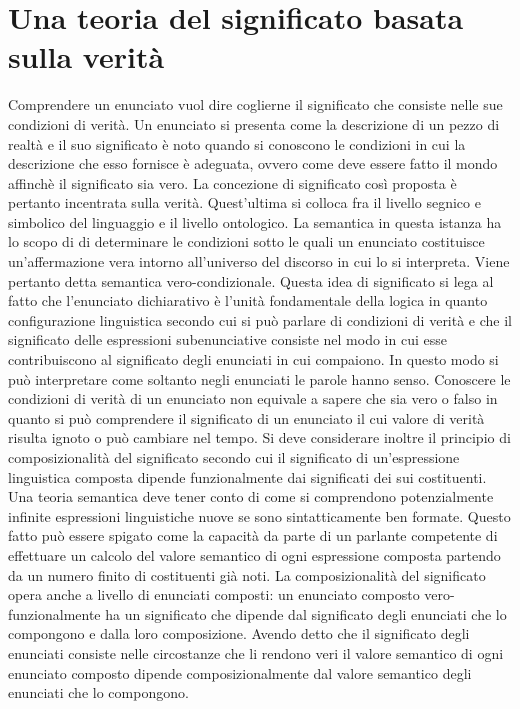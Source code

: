 \section{Una teoria del significato basata sulla verit\`a}
Comprendere un enunciato vuol dire coglierne il significato che consiste nelle sue condizioni di verit\`a. Un enunciato si presenta come la descrizione di un pezzo di realt\`a e il suo significato \`e noto quando si 
conoscono le condizioni in cui la descrizione che esso fornisce \`e adeguata, ovvero come deve essere fatto il mondo affinch\`e il significato sia vero. La concezione di significato cos\`i proposta \`e pertanto 
incentrata sulla verit\`a. Quest'ultima si colloca fra il livello segnico e simbolico del linguaggio e il livello ontologico. La semantica in questa istanza ha lo scopo di di determinare le condizioni sotto le quali un 
enunciato costituisce un'affermazione vera intorno all'universo del discorso in cui lo si interpreta. Viene pertanto detta semantica vero-condizionale. Questa idea di significato si lega al fatto che l'enunciato 
dichiarativo \`e l'unit\`a fondamentale della logica in quanto configurazione linguistica secondo cui si pu\`o parlare di condizioni di verit\`a e che il significato delle espressioni subenunciative consiste nel modo in 
cui esse contribuiscono al significato degli enunciati in cui compaiono. In questo modo si pu\`o interpretare come soltanto negli enunciati le parole hanno senso. Conoscere le condizioni di verit\`a di un enunciato 
non equivale a sapere che sia vero o falso in quanto si pu\`o comprendere il significato di un enunciato il cui valore di verit\`a risulta ignoto o pu\`o cambiare nel tempo. Si deve considerare inoltre il principio di 
composizionalit\`a del significato secondo cui il significato di un'espressione linguistica composta dipende funzionalmente dai significati dei sui costituenti. Una teoria semantica deve tener conto di come si 
comprendono potenzialmente infinite espressioni linguistiche nuove se sono sintatticamente ben formate. Questo fatto pu\`o essere spigato come la capacit\`a da parte di un parlante competente di effettuare 
un calcolo del valore semantico di ogni espressione composta partendo da un numero finito di costituenti gi\`a noti. La composizionalit\`a del significato opera anche a livello di enunciati composti: un enunciato 
composto vero-funzionalmente ha un significato che dipende dal significato degli enunciati che lo compongono e dalla loro composizione. Avendo detto che il significato degli enunciati consiste nelle 
circostanze che li rendono veri il valore semantico di ogni enunciato composto dipende composizionalmente dal valore semantico degli enunciati che lo compongono. 
